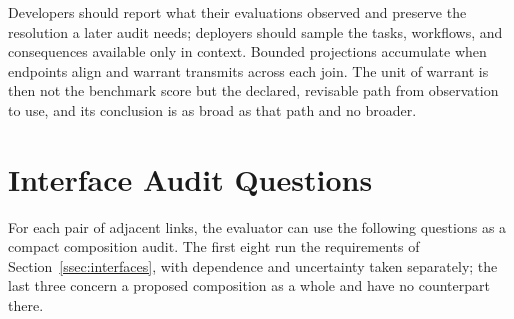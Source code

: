 \documentclass[12pt]{article}
\begin{document}
Developers should report what their evaluations observed and preserve the resolution a later audit needs; deployers should sample the tasks, workflows, and consequences available only in context. Bounded projections accumulate when endpoints align and warrant transmits across each join. The unit of warrant is then not the benchmark score but the declared, revisable path from observation to use, and its conclusion is as broad as that path and no broader.

\appendix

\section{Interface Audit Questions}\label{app:interface_questions}

For each pair of adjacent links, the evaluator can use the following questions as a compact composition audit. The first eight run the requirements of Section~\ref{ssec:interfaces}, with dependence and uncertainty taken separately; the last three concern a proposed composition as a whole and have no counterpart there.
\end{document}

